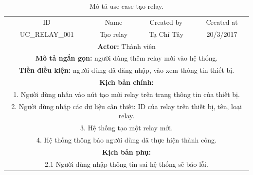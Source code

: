 \documentclass[a4paper,12pt,oneside]{article}
\begin{document}
\begin{table}[!htp]
\centering
\begin{tabularx}{\linewidth}{ |c||c|c|c| }
\hline
ID & Name & Created by & Created at\\
UC\_RELAY\_001 & Tạo relay & Tạ Chí Tây & 20/3/2017\\
\hline
\multicolumn{4}{|X|}{\textbf{Actor:} Thành viên }\\
\hline
\multicolumn{4}{|X|}{\textbf{Mô tả ngắn gọn:} người dùng thêm relay mới vào hệ thống. }\\
\hline
\multicolumn{4}{|X|}{\textbf{Tiền điều kiện:} người dùng đã đăng nhập, vào xem thông tin thiết bị.}\\
\hline
\multicolumn{4}{|X|}{\textbf{Kịch bản chính:}}\\
\multicolumn{4}{|X|}{1.	Người dùng nhấn vào nút tạo mới relay trên trang thông tin của thiết bị.}\\
\multicolumn{4}{|X|}{ 
2.	Người dùng nhập các dữ liệu cân thiết: ID của relay trên thiết bị, tên, loại relay.}\\
\multicolumn{4}{|X|}{
3.	Hệ thống tạo một relay mới.}\\

\multicolumn{4}{|X|}{4. Hệ thống thông báo người dùng đã thực hiện thành công.}\\
\hline
\multicolumn{4}{|X|}{\textbf{Kịch bản phụ:}}\\
\multicolumn{4}{|X|}{2.1    Người dùng nhập thông tin sai hệ thống sẽ báo lỗi.}\\
\hline

\end{tabularx}
\caption{Mô tả use case tạo relay.}
\end{table}
\end{document}
